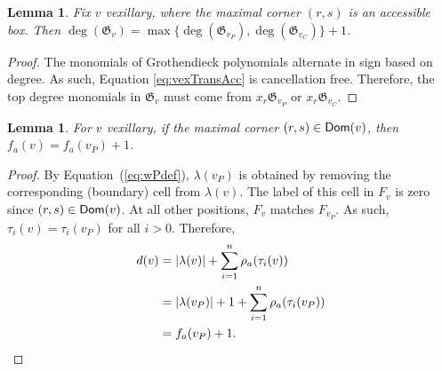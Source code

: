 \documentclass[12pt]{amsart}
\newtheorem{lemma}[theorem]{Lemma}
\theoremstyle{definition}
\theoremstyle{remark}
\numberwithin{equation}{section}
\newcommand{\maxsizeantidiag}{\rho_a}
\newcommand{\antidiagstat}{f_a}
\begin{document}
\begin{lemma}
	\label{lemma:accdegree}
	Fix $v$ vexillary, where the maximal corner $(r,s)$ is an accessible box.  Then $\deg(\mathfrak G_v)=\max\{\deg(\mathfrak G_{v_P}),\deg(\mathfrak G_{v_C})\}+1$.
\end{lemma}
\begin{proof}
	The monomials of Grothendieck polynomials alternate in sign based on degree. As such, Equation \eqref{eq:vexTransAcc} is cancellation free.  Therefore, the top degree monomials in $\mathfrak G_v$ must come from $x_r\mathfrak G_{v_P}$ or $x_r\mathfrak G_{v_C}$.
\end{proof}



\begin{lemma}
\label{lemma:dommaximalcorner}
For $v$ vexillary, 
 if the maximal corner $(r,s)\in {\sf Dom}(v)$, then $\antidiagstat(v)=\antidiagstat(v_P)+1$.
\end{lemma}
\begin{proof}
By Equation~(\ref{eq:wPdef}), $\lambda(v_P)$ is obtained by removing the corresponding (boundary) cell  from $\lambda(v)$.  The label of this cell in $F_v$ is zero since $(r,s)\in {\sf Dom}(v)$.  At all other positions, $F_v$ matches $F_{v_P}$.  As such, $\tau_i(v)=\tau_i(v_P)$ for all $i>0$.  Therefore,
\begin{align*}
d(v)&= |\lambda(v)|+\sum_{i=1}^n \maxsizeantidiag(\tau_i(v))\\
&= |\lambda(v_P)|+1+\sum_{i=1}^n\maxsizeantidiag(\tau_i(v_P))\\
&=\antidiagstat(v_P)+1. \qedhere
\end{align*}
\end{proof}
\end{document}
